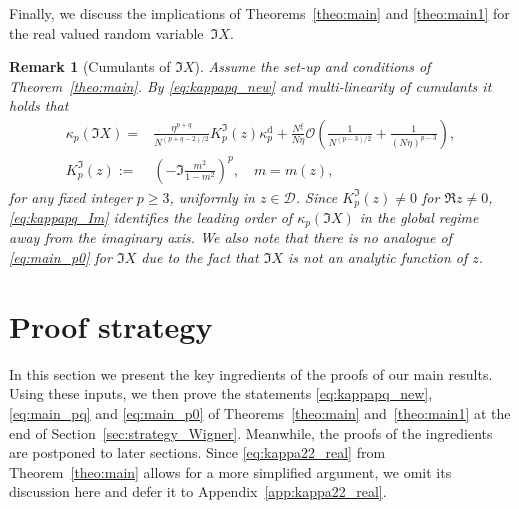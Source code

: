 \documentclass[10pt]{amsart}
\newtheorem{remark}[theorem]{Remark}
\numberwithin{equation}{section}
\begin{document}
Finally, we discuss the implications of Theorems~\ref{theo:main} and \ref{theo:main1} for the real valued random variable~$\Im X$.


\begin{remark}[Cumulants of $\Im X$] Assume the set-up and conditions of Theorem~\ref{theo:main}. By \eqref{eq:kappapq_new} and multi-linearity of cumulants it holds that 
\begin{equation}
\begin{split}
\kappa_p\left(\Im X\right) = &\frac{\eta^{p+q}}{N^{(p+q-2)/2}}K_p^\Im (z)\kappa_{p}^{\mathrm{d}} + \frac{N^\xi}{N\eta} \mathcal{O}\left( \frac{1}{N^{(p-3)/2}}+ \frac{1}{(N\eta)^{p-3}}\right),\\
K_p^\Im(z):=&\left(-\Im \frac{m^2}{1-m^2}\right)^p,\quad m=m(z),
\end{split}
\label{eq:kappapq_Im}
\end{equation}
for any fixed integer $p\ge 3$, uniformly in $z\in\mathcal{D}$. Since $K_p^\Im (z)\neq 0$ for $\Re z\neq 0$, \eqref{eq:kappapq_Im} identifies the leading order of $\kappa_p(\Im X)$ in the global regime away from the imaginary axis. We also note that there is no analogue of \eqref{eq:main_p0} for $\Im X$ due to the fact that $\Im X$ is not an analytic function of $z$.
\end{remark}



\section{Proof strategy}\label{sec:strategy}


In this section we present the key ingredients of the proofs of our main results. Using these inputs, we then prove the statements \eqref{eq:kappapq_new}, \eqref{eq:main_pq} and \eqref{eq:main_p0} of Theorems~\ref{theo:main} and~\ref{theo:main1} at the end of Section~\ref{sec:strategy_Wigner}. Meanwhile, the proofs of the ingredients are postponed to later sections. Since \eqref{eq:kappa22_real} from Theorem~\ref{theo:main} allows for a more simplified argument, we omit its discussion here and defer it to Appendix~\ref{app:kappa22_real}.
\end{document}
